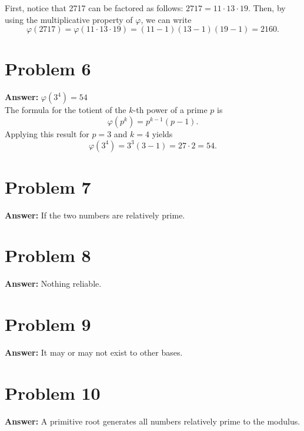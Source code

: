 \documentclass[11pt]{article}
\begin{document}
First, notice that 2717 can be factored as follows: \(2717=11\cdot 13\cdot 19\).
Then, by using the multiplicative property of \(\varphi\), we can write
\begin{equation}
\varphi(2717)=\varphi(11\cdot 13\cdot 19)=(11-1)(13-1)(19-1)=2160.
\end{equation}
\section*{Problem 6}
\label{sec:orge3a315a}
\textbf{Answer:} \(\varphi(3^4)=54\)\\

The formula for the totient of the \(k\)-th power of a prime \(p\) is
\begin{equation}
\varphi(p^k)=p^{k-1}(p-1).
\end{equation}
Applying this result for \(p=3\) and \(k=4\) yields
\begin{equation}
\varphi(3^4)=3^3(3-1)=27\cdot 2=54.
\end{equation}
\section*{Problem 7}
\label{sec:org3192587}
\textbf{Answer:} If the two numbers are relatively prime.
\section*{Problem 8}
\label{sec:org1b1b07c}
\textbf{Answer:} Nothing reliable.
\section*{Problem 9}
\label{sec:org0b55b58}
\textbf{Answer:} It may or may not exist to other bases.
\section*{Problem 10}
\label{sec:org0305ec0}
\textbf{Answer:} A primitive root generates all numbers relatively prime to the
modulus.
\end{document}
